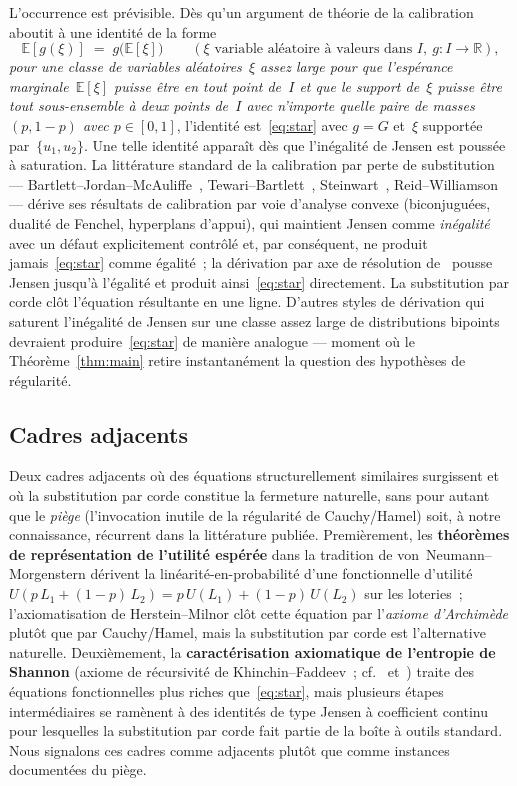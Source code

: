 \documentclass[11pt,a4paper]{amsart}
\newcommand{\R}{\mathbb R}
\newcommand{\E}{\mathbb E}
\begin{document}
L'occurrence est prévisible. Dès qu'un argument de théorie de la
calibration aboutit à une identité de la forme
\[
\E[g(\xi)] \;=\; g\bigl(\E[\xi]\bigr)
\qquad (\xi \text{ variable aléatoire à valeurs dans } I,\
g\colon I \to \R),
\]
\emph{pour une classe de variables aléatoires~$\xi$ assez large pour que
l'espérance marginale~$\E[\xi]$ puisse être en tout point de~$I$ et que
le support de~$\xi$ puisse être tout sous-ensemble à deux points de~$I$
avec n'importe quelle paire de masses $(p, 1-p)$ avec $p \in [0, 1]$},
l'identité est~\eqref{eq:star} avec $g = G$ et~$\xi$ supportée
par~$\{u_1, u_2\}$. Une telle identité apparaît dès que l'inégalité de
Jensen est poussée à saturation. La littérature standard de la calibration
par perte de substitution --- Bartlett--Jordan--McAuliffe~\cite{BJM2006},
Tewari--Bartlett~\cite{TewariBartlett2007},
Steinwart~\cite{Steinwart2007},
Reid--Williamson~\cite{ReidWilliamson2010, ReidWilliamson2011} --- dérive
ses résultats de calibration par voie d'analyse convexe (biconjuguées,
dualité de Fenchel, hyperplans d'appui), qui maintient Jensen comme
\emph{inégalité} avec un défaut explicitement contrôlé et, par conséquent,
ne produit jamais~\eqref{eq:star} comme égalité~; la dérivation par axe
de résolution de~\cite{El2} pousse Jensen jusqu'à l'égalité et produit
ainsi~\eqref{eq:star} directement. La substitution par corde clôt
l'équation résultante en une ligne. D'autres styles de dérivation qui
saturent l'inégalité de Jensen sur une classe assez large de distributions
bipoints devraient produire~\eqref{eq:star} de manière analogue ---
moment où le Théorème~\ref{thm:main} retire instantanément la question des
hypothèses de régularité.

\subsection{Cadres adjacents}
\label{ssec:adjacent}

Deux cadres adjacents où des équations structurellement similaires
surgissent et où la substitution par corde constitue la fermeture
naturelle, sans pour autant que le \emph{piège} (l'invocation inutile de
la régularité de Cauchy/Hamel) soit, à notre connaissance, récurrent dans
la littérature publiée. Premièrement, les \textbf{théorèmes de
représentation de l'utilité espérée} dans la tradition de
von~Neumann--Morgenstern dérivent la linéarité-en-probabilité d'une
fonctionnelle d'utilité $U(p\,L_1 + (1-p)\,L_2) = p\,U(L_1) + (1-p)\,U(L_2)$
sur les loteries~; l'axiomatisation de Herstein--Milnor clôt cette
équation par l'\emph{axiome d'Archimède} plutôt que par Cauchy/Hamel, mais
la substitution par corde est l'alternative naturelle. Deuxièmement, la
\textbf{caractérisation axiomatique de l'entropie de Shannon} (axiome de
récursivité de Khinchin--Faddeev~; cf.~\cite{Aczel1966}
et~\cite{AczelDhombres1989}) traite des équations fonctionnelles plus
riches que~\eqref{eq:star}, mais plusieurs étapes intermédiaires se
ramènent à des identités de type Jensen à coefficient continu pour
lesquelles la substitution par corde fait partie de la boîte à outils
standard. Nous signalons ces cadres comme adjacents plutôt que comme
instances documentées du piège.
\end{document}
